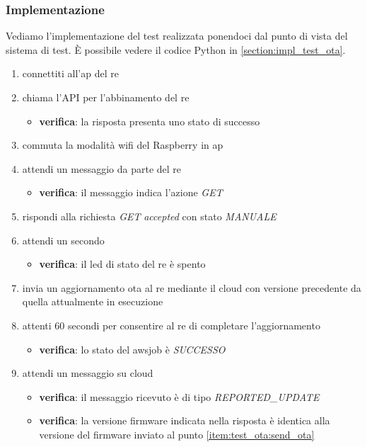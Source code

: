 \documentclass[12pt,a4paper,twoside,titlepage]{book}
\begin{document}
\subsubsection{Implementazione}
Vediamo l'implementazione del test realizzata ponendoci dal punto di vista del sistema di test. 
È possibile vedere il codice Python in \autoref{section:impl_test_ota}.

\begin{enumerate}
    \item connettiti all'\acrshort{ap} del \acrshort{re}
    \item chiama l'API per l'abbinamento del \acrshort{re} 
    \begin{itemize}
        \item \textbf{verifica}: la risposta presenta uno stato di successo 
    \end{itemize}
    \item commuta la modalità \Gls{wifi} del Raspberry in \acrshort{ap}
    \item attendi un messaggio da parte del \acrshort{re}
    \begin{itemize}
        \item \textbf{verifica}: il messaggio indica l'azione \textit{GET}
    \end{itemize}
    \item rispondi alla richiesta \textit{GET} \textit{accepted} con stato \textit{MANUALE}
    \item attendi un secondo 
    \begin{itemize}
        \item \textbf{verifica}: il \acrshort{led} di stato del \acrshort{re} è spento 
    \end{itemize}
    \item invia un aggiornamento \acrshort{ota} al \acrshort{re} mediante il \gls{cloud} con versione 
        precedente da quella attualmente in esecuzione \label{item:test_ota:send_ota}
    \item attenti 60 secondi per consentire al \acrshort{re} di completare l'aggiornamento
    \begin{itemize}
        \item \textbf{verifica}: lo stato del \gls{awsjob} è \textit{SUCCESSO}
    \end{itemize}
    \item attendi un messaggio su cloud
    \begin{itemize}
        \item \textbf{verifica}: il messaggio ricevuto è di tipo \textit{REPORTED\_UPDATE}
        \item \textbf{verifica}: la versione \gls{firmware} indicata nella risposta è identica alla 
            versione del \gls{firmware} inviato al punto \autoref{item:test_ota:send_ota}
    \end{itemize}
\end{enumerate}
\end{document}
